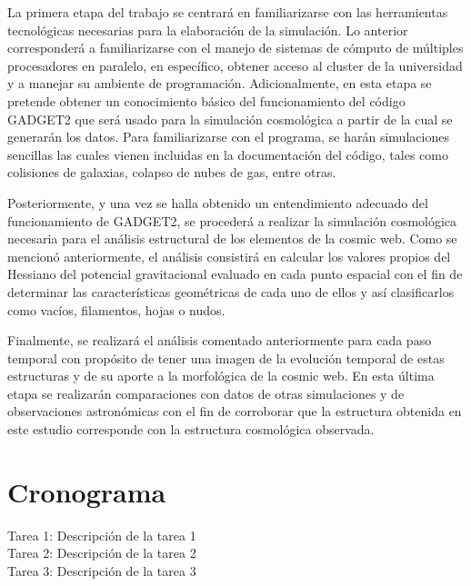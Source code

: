 \documentclass{article}
\begin{document}
La primera etapa del trabajo se centrará en familiarizarse con las herramientas tecnológicas necesarias para la elaboración de la simulación. Lo anterior corresponderá a familiarizarse con el manejo de sistemas de cómputo de múltiples procesadores en paralelo, en específico, obtener acceso al cluster de la universidad y a manejar su ambiente de programación. Adicionalmente, en esta etapa se pretende obtener un conocimiento básico del funcionamiento del código GADGET2 que será usado para la simulación cosmológica a partir de la cual se generarán los datos. Para familiarizarse con el programa, se harán simulaciones sencillas las cuales vienen incluidas en la documentación del código, tales como colisiones de galaxias, colapso de nubes de gas, entre otras. 

Posteriormente, y una vez se halla obtenido un entendimiento adecuado del funcionamiento de GADGET2, se procederá a realizar la simulación cosmológica necesaria para el análisis estructural de los elementos de la cosmic web. Como se mencionó anteriormente, el análisis consistirá en calcular los valores propios del Hessiano del potencial gravitacional evaluado en cada punto espacial con el fin de determinar las características geométricas de cada uno de ellos y así clasificarlos como vacíos, filamentos, hojas o nudos.

Finalmente, se realizará el análisis comentado anteriormente para cada paso temporal con propósito de tener una imagen de la evolución temporal de estas estructuras y de su aporte a la morfológica de la cosmic web. En esta última etapa se realizarán comparaciones con datos de otras simulaciones y de observaciones astronómicas con el fin de corroborar que la estructura obtenida en este estudio corresponde con la estructura cosmológica observada.         


\section{Cronograma}

Tarea 1: Descripción de la tarea 1 \\
Tarea 2: Descripción de la tarea 2 \\
Tarea 3: Descripción de la tarea 3 \\
\end{document}
